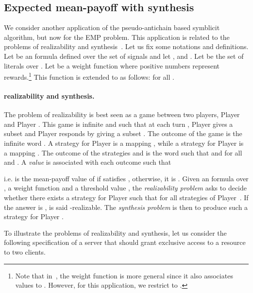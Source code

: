 \subsection{Expected mean-payoff with \LTLMP synthesis}
We consider another application of the pseudo-antichain based symblicit algorithm, but now for the EMP problem. This application is related to the problems of \LTLMP realizability and synthesis~\cite{DBLP:journals/corr/abs-1210-3539,DBLP:conf/tacas/BohyBFR13}. Let us fix some notations and definitions. Let  be an \LTL formula defined over the set  of signals and let ,  and . Let  be the set of literals over . Let  be a weight function where positive numbers represent rewards.\footnote{Note that in~\cite{DBLP:journals/corr/abs-1210-3539,DBLP:conf/tacas/BohyBFR13}, the weight function  is more general since it also associates values to . However, for this application, we restrict  to .} This function is extended to  as follows:   for all .

\paragraph{ realizability and synthesis.} The problem of \LTLMP realizability is best seen as a game between two players, Player  and Player . This game is infinite and such that at each turn , Player  gives a subset  and Player  responds by giving a subset . The outcome of the game is the infinite word . A strategy for Player  is a mapping , while a strategy for Player  is a mapping . The outcome of the strategies  and  is the word  such that  and for all  and . A \textit{value}  is associated with each outcome  such that
\begin{center}


\end{center}
i.e.  is the mean-payoff value of  if  satisfies , otherwise, it is . Given an  formula  over , a weight function  and a threshold value , the  \textit{realizability problem} asks to decide whether there exists a strategy  for Player  such that  for all strategies  of Player~. If the answer is ,  is said -realizable. The  \textit{synthesis problem} is then to produce such a strategy  for Player . 

To illustrate the problems of  realizability and synthesis, let us consider the following specification of a server that should grant exclusive access to a resource to two clients.

